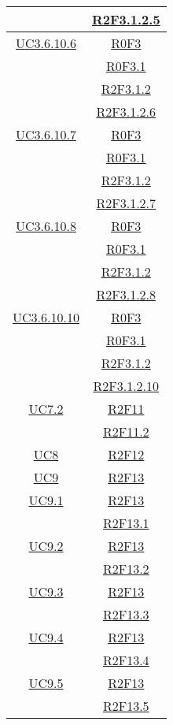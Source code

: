 \begin{longtable}{|c|c|}
& \hyperlink{R2F3.1.2.5}{R2F3.1.2.5}\\
\hline
\hyperlink{UC3.6.10.6}{UC3.6.10.6} & \hyperlink{R0F3}{R0F3}\\
& \hyperlink{R0F3.1}{R0F3.1}\\
& \hyperlink{R2F3.1.2}{R2F3.1.2}\\
& \hyperlink{R2F3.1.2.6}{R2F3.1.2.6}\\
\hline
\hyperlink{UC3.6.10.7}{UC3.6.10.7} & \hyperlink{R0F3}{R0F3}\\
& \hyperlink{R0F3.1}{R0F3.1}\\
& \hyperlink{R2F3.1.2}{R2F3.1.2}\\
& \hyperlink{R2F3.1.2.7}{R2F3.1.2.7}\\
\hline
\hyperlink{UC3.6.10.8}{UC3.6.10.8} & \hyperlink{R0F3}{R0F3}\\
& \hyperlink{R0F3.1}{R0F3.1}\\
& \hyperlink{R2F3.1.2}{R2F3.1.2}\\
& \hyperlink{R2F3.1.2.8}{R2F3.1.2.8}\\
\hline
\hyperlink{UC3.6.10.10}{UC3.6.10.10} & \hyperlink{R0F3}{R0F3}\\
& \hyperlink{R0F3.1}{R0F3.1}\\
& \hyperlink{R2F3.1.2}{R2F3.1.2}\\
& \hyperlink{R2F3.1.2.10}{R2F3.1.2.10}\\
\hline
\hyperlink{UC7.2}{UC7.2} & \hyperlink{R2F11}{R2F11}\\
& \hyperlink{R2F11.2}{R2F11.2}\\
\hline
\hyperlink{UC8}{UC8} & \hyperlink{R2F12}{R2F12}\\
\hline
\hyperlink{UC9}{UC9} & \hyperlink{R2F13}{R2F13}\\
\hline
\hyperlink{UC9.1}{UC9.1} & \hyperlink{R2F13}{R2F13}\\
& \hyperlink{R2F13.1}{R2F13.1}\\
\hline
\hyperlink{UC9.2}{UC9.2} & \hyperlink{R2F13}{R2F13}\\
& \hyperlink{R2F13.2}{R2F13.2}\\
\hline
\hyperlink{UC9.3}{UC9.3} & \hyperlink{R2F13}{R2F13}\\
& \hyperlink{R2F13.3}{R2F13.3}\\
\hline
\hyperlink{UC9.4}{UC9.4} & \hyperlink{R2F13}{R2F13}\\
& \hyperlink{R2F13.4}{R2F13.4}\\
\hline
\hyperlink{UC9.5}{UC9.5} & \hyperlink{R2F13}{R2F13}\\
& \hyperlink{R2F13.5}{R2F13.5}\\

\end{longtable}
